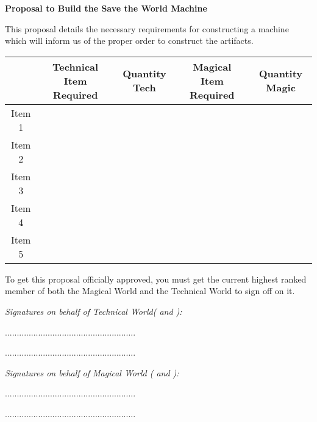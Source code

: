 \documentclass[white]{guildcamp3}
\begin{document}
\name{\wProposal{}} %
\large\textbf{Proposal to Build the Save the World Machine}  


This proposal details the necessary requirements for constructing a machine which will inform us of the proper order to construct the artifacts. 


\begin{tabular}{|c|c|c|c|c|}
	\hline \rule[-2ex]{0pt}{5.5ex}  & Technical Item Required & Quantity Tech & Magical Item Required & Quantity Magic \\ 
	\hline \rule[-2ex]{0pt}{5.5ex} Item 1 &  &  &  &  \\ 
	\hline \rule[-2ex]{0pt}{5.5ex} Item 2 &  &  &  &  \\ 
	\hline \rule[-2ex]{0pt}{5.5ex} Item 3 &  &  &  &  \\ 
	\hline \rule[-2ex]{0pt}{5.5ex} Item 4 &  &  &  &  \\ 
	\hline \rule[-2ex]{0pt}{5.5ex} Item 5 &  &  &  &  \\ 
	\hline 
\end{tabular} 

To get this proposal officially approved, you must get the current highest ranked member of both the Magical World and the Technical World to sign off on it. 



\emph{Signatures on behalf of Technical World(\cPoliOne{\intro} and \cPoliTwo{\intro}): }
	
	.......................................................
	
	.......................................................

\emph{Signatures on behalf of Magical World (\cNobleOne{\intro} and \cNobleTwo{\intro}):}
	
	.......................................................
	
	.......................................................


\end{document}
